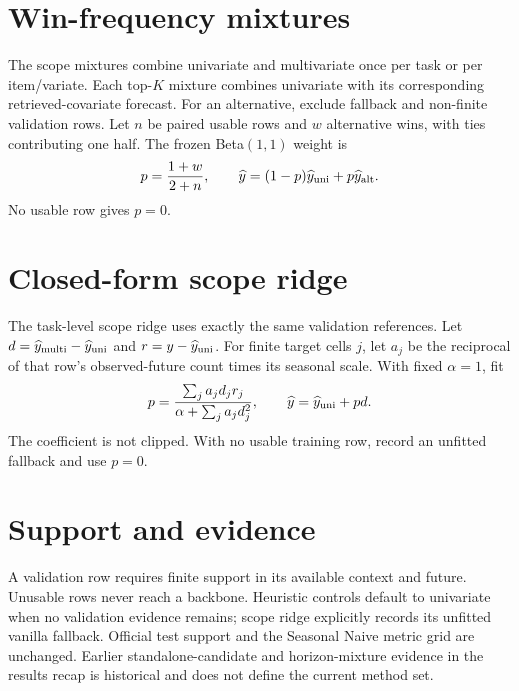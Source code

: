 \documentclass[10pt]{article}
\begin{document}
\section{Win-frequency mixtures}
The scope mixtures combine univariate and multivariate once per task or per
item/variate. Each top-$K$ mixture combines univariate with its corresponding
retrieved-covariate forecast. For an alternative, exclude fallback and
non-finite validation rows. Let $n$ be paired usable rows and $w$ alternative
wins, with ties contributing one half. The frozen Beta$(1,1)$ weight is
\[
p=\frac{1+w}{2+n},\qquad
\widehat y=(1-p)\widehat y_{\rm uni}+p\widehat y_{\rm alt}.
\]
No usable row gives $p=0$.

\section{Closed-form scope ridge}
The task-level scope ridge uses exactly the same validation references. Let
$d=\widehat y_{\rm multi}-\widehat y_{\rm uni}$ and
$r=y-\widehat y_{\rm uni}$. For finite target cells $j$, let $a_j$ be the
reciprocal of that row's observed-future count times its seasonal scale. With
fixed $\alpha=1$, fit
\[
p=\frac{\sum_j a_jd_jr_j}{\alpha+\sum_j a_jd_j^2},\qquad
\widehat y=\widehat y_{\rm uni}+pd.
\]
The coefficient is not clipped. With no usable training row, record an
unfitted fallback and use $p=0$.

\section{Support and evidence}
A validation row requires finite support in its available context and future.
Unusable rows never reach a backbone. Heuristic controls default to univariate
when no validation evidence remains; scope ridge explicitly records its
unfitted vanilla fallback. Official test support and the Seasonal Naive metric
grid are unchanged. Earlier standalone-candidate and horizon-mixture evidence
in the results recap is historical and does not define the current method set.
\end{document}
